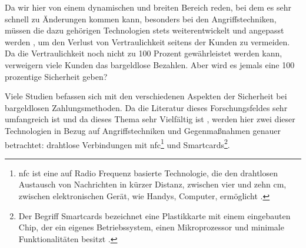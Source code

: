 Da wir hier von einem dynamischen und breiten Bereich reden, bei dem es sehr schnell zu Änderungen kommen kann, 
besonders bei den Angriffstechniken, müssen die dazu gehörigen Technologien stets weiterentwickelt und angepasst
werden \cite{refip:NYRS}, um den Verlust von Vertraulichkeit seitens der Kunden zu vermeiden. Da die Vertraulichkeit noch
nicht zu 100 Prozent gewährleistet werden kann, verweigern viele Kunden das bargeldlose Bezahlen. Aber
wird es jemals eine 100 prozentige Sicherheit geben?

Viele Studien befassen sich mit den verschiedenen Aspekten der Sicherheit bei bargeldlosen Zahlungsmethoden.
Da die Literatur dieses Forschungsfeldes sehr umfangreich ist und da dieses Thema sehr Vielfältig ist 
\cite{refip:GMPS}, werden hier zwei dieser Technologien in Bezug auf Angriffstechniken und Gegenmaßnahmen 
genauer betrachtet: drahtlose Verbindungen mit \acrfull{nfc}\footnote{\acrfull{nfc} ist eine auf Radio Frequenz
basierte Technologie, die den drahtlosen Austausch von Nachrichten in kürzer Distanz, zwischen vier und zehn cm, 
zwischen elektronischen Gerät, wie Handys, Computer, ermöglicht \cite{refart:NFNK}.} und Smartcards\footnote{Der
Begriff Smartcards bezeichnet eine Plastikkarte mit einem eingebauten Chip, der ein eigenes Betriebssystem, 
einen Mikroprozessor und minimale Funktionalitäten besitzt \cite{refip:JFSB}.}.